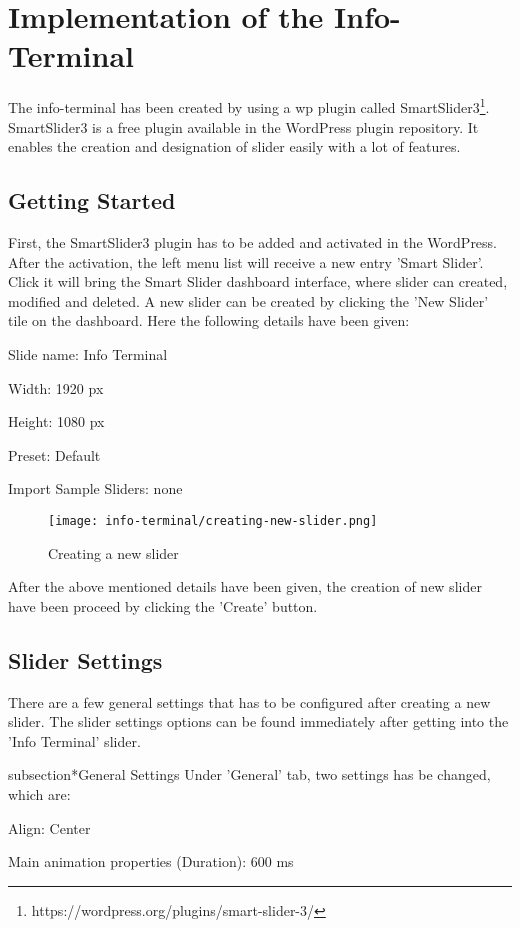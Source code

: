 \chapter{Implementation of the Info-Terminal}
The info-terminal has been created by using a \ac{wp} plugin called SmartSlider3\footnote{https://wordpress.org/plugins/smart-slider-3/}. SmartSlider3 is a free plugin available in the WordPress plugin repository. It enables the creation and designation of slider \cite{RefsnesData.8102017} easily with a lot of features.

\section{Getting Started}
First, the SmartSlider3 plugin has to be added and activated in the WordPress. After the activation, the left menu list will receive a new entry 'Smart Slider'. Click it will bring the Smart Slider dashboard interface, where slider can created, modified and deleted. A new slider can be created by clicking the 'New Slider' tile on the dashboard. Here the following details have been given:
\begin{itemize*}
\item Slide name: Info Terminal
\item Width: 1920 px
\item Height: 1080 px
\item Preset: Default
\item Import Sample Sliders: none
\end{itemize*}
\begin{figure}[ht]
\caption{Creating a new slider}
\label{creating-a-new-slider}
\centering
\texttt{[image: info-terminal/creating-new-slider.png]}
\end{figure}

After the above mentioned details have been given, the creation of new slider have been proceed by clicking the 'Create' button.

\section{Slider Settings}
There are a few general settings that has to be configured after creating a new slider. The slider settings options can be found immediately after getting into the 'Info Terminal' slider.

subsection*{General Settings}
Under 'General' tab, two settings has be changed, which are:
\begin{itemize*}
\item Align: Center
\item Main animation properties (Duration): 600 ms
\end{itemize*}

